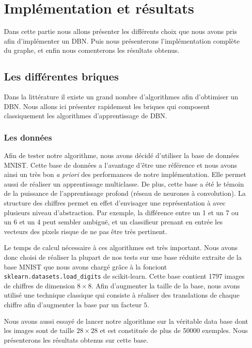 \documentclass[10pt,a4paper]{article}
\begin{document}
\section{Implémentation et résultats}


Dans cette partie nous allons présenter les différents choix que nous avons pris afin d'implémenter un DBN. Puis nous présenterons l'implémentation complète du graphe, et enfin nous comenterons les résultats obtenus.


\subsection{Les différentes briques}


Dans la littérature il existe un grand nombre d'algorithmes afin d'obtimiser un DBN. Nous allons ici présenter rapidement les briques qui composent classiquement les algorithmes d'apprentissage de DBN.


\subsubsection{Les données}


Afin de tester notre algorithme, nous avons décidé d'utiliser la base de données MNIST. Cette base de données a l'avantage d'être une référence et nous avons ainsi un très bon \textit{a priori} des performances de notre implémentation. Elle permet aussi de réaliser un apprentissage multiclasse. De plus, cette base a été le témoin de la puissance de l'apprentissage profond (réseau de neurones à convolution). La structure des chiffres permet en effet d'envisager une représentation à avec plusieurs niveau d'abstraction. Par exemple, la différence entre un 1 et un 7 ou un 6 et un 4 peut sembler ambiguë, et un classifieur prenant en entrée les vecteurs des pixels risque de ne pas être très pertinent.


Le temps de calcul nécessaire à ces algorithmes est très important. Nous avons donc choisi de réaliser la plupart de nos tests sur une base réduite extraite de la base MNIST que nous avons chargé grâce à la fonciont \texttt{sklearn.datasets.load\_digits} de scikit-learn. Cette base contient 1797 images de chiffres de dimension $8 \times 8$. Afin d'augmenter la taille de la base, nous avons utilisé une technique classique qui consiste à réaliser des translations de chaque chiffre afin d'augmenter la base par un facteur $5$.


Nous avons aussi essayé de lancer notre algorithme sur la véritable data base dont les images sont de taille $28 \times 28$ et est constituée de plus de 50000 exemples. Nous présenterons les résultats obtenus sur cette base. 
\end{document}

